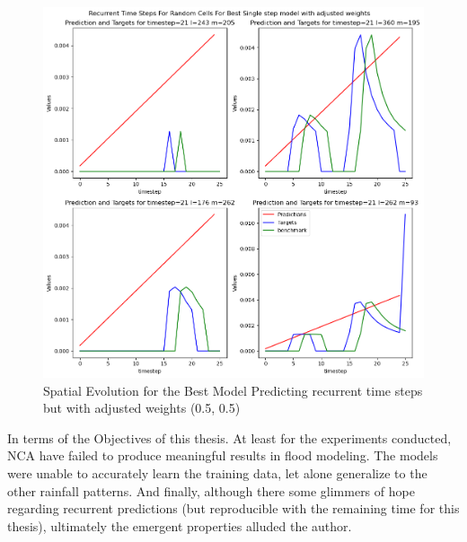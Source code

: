 \begin{figure}[tbph]
	\centering
	\includegraphics[width=0.8\linewidth, height=0.3\textheight]{Figures/Results/Final_Results/Best_SS_adjusted_weights(5,5)}
	\caption[Spatial Single Time step Predictions]{Spatial Evolution for the Best Model Predicting recurrent time steps but with adjusted weights (0.5, 0.5)}
	\label{fig:adjusted-recurrent-rc}
\end{figure}

In terms of the Objectives of this thesis. At least for the experiments conducted, NCA have failed to produce meaningful results in flood modeling. The models were unable to accurately learn the training data, let alone generalize to the other rainfall patterns. And finally, although there some glimmers of hope regarding recurrent predictions (but reproducible with the remaining time for this thesis), ultimately the emergent properties alluded the author.

